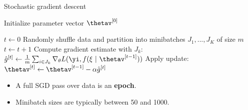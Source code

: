 \documentclass[11pt,compress,t,notes=noshow, xcolor=table]{beamer}
\begin{document}
\begin{vbframe}{Stochastic gradient descent}

  \begin{algorithm}[H]
  \footnotesize
    \caption{Basic SGD pseudo code}
    \begin{algorithmic}[1]
    \State Initialize parameter vector $\thetav^{[0]}$ 
    
    \State $t \leftarrow 0$
    \State Randomly shuffle data and partition into minibatches $J_1, ..., J_K$ of size $m$
      \State $t \leftarrow t + 1$ 
      \State Compute gradient estimate with $J_k$: $\hat{g}^{[t]} \leftarrow \frac{1}{m} \sum_{i \in J_k} \nabla_\theta L(\yi, f(\xi ~|~ \thetav^{[t-1]})) $
      \State Apply update: $\thetav^{[t]} \leftarrow \thetav^{[t-1]} - \alpha \hat{g}^{[t]}$
      
      \EndFor
    
        
      \EndWhile
    \end{algorithmic}
  \end{algorithm}
  \begin{itemize}
    \item A full SGD pass over data is an \textbf{epoch}.
    \item Minibatch sizes are typically between 50 and 1000.
   \end{itemize}
 
\framebreak


\end{vbframe}
\end{document}
